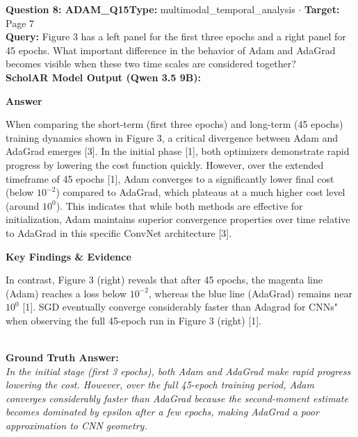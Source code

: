 \documentclass[10pt,a4paper]{article}
\begin{document}
\begin{tcolorbox}[questionbox]
{\noindent\bfseries\large\color{navy} Question 8: ADAM\_Q15}\hfill {\footnotesize\color{darkteal}\textbf{Type:} multimodal\_temporal\_analysis $\cdot$ \textbf{Target:} Page 7}\\[4pt]
{\noindent\bfseries\color{accentblue} Query: } Figure 3 has a left panel for the first three epochs and a right panel for 45 epochs. What important difference in the behavior of Adam and AdaGrad becomes visible when these two time scales are considered together?\\[6pt]
{\noindent\bfseries\color{navy} ScholAR Model Output (Qwen 3.5 9B):}\\[2pt]
{\small \noindent \textbf{Answer}\par\vspace{3pt}When comparing the short-term (first three epochs) and long-term (45 epochs) training dynamics shown in Figure 3, a critical divergence between Adam and AdaGrad emerges [3]. In the initial phase [1], both optimizers demonstrate rapid progress by lowering the cost function quickly. However, over the extended timeframe of 45 epochs [1], Adam converges to a significantly lower final cost (below $10^{-2}$) compared to AdaGrad, which plateaus at a much higher cost level (around $10^{0}$). This indicates that while both methods are effective for initialization, Adam maintains superior convergence properties over time relative to AdaGrad in this specific ConvNet architecture [3].\par\vspace{3pt}\noindent \textbf{Key Findings \& Evidence}\par\vspace{3pt}In contrast, Figure 3 (right) reveals that after 45 epochs, the magenta line (Adam) reaches a loss below $10^{-2}$, whereas the blue line (AdaGrad) remains near $10^{0}$ [1]. SGD eventually converge considerably faster than Adagrad for CNNs" when observing the full 45-epoch run in Figure 3 (right) [1].}\\[6pt]
{\noindent\bfseries\color{darkteal} Ground Truth Answer:}\\[2pt]
{\small\itshape In the initial stage (first 3 epochs), both Adam and AdaGrad make rapid progress lowering the cost. However, over the full 45-epoch training period, Adam converges considerably faster than AdaGrad because the second-moment estimate becomes dominated by epsilon after a few epochs, making AdaGrad a poor approximation to CNN geometry.}\\[4pt]

\end{tcolorbox}
\end{document}
